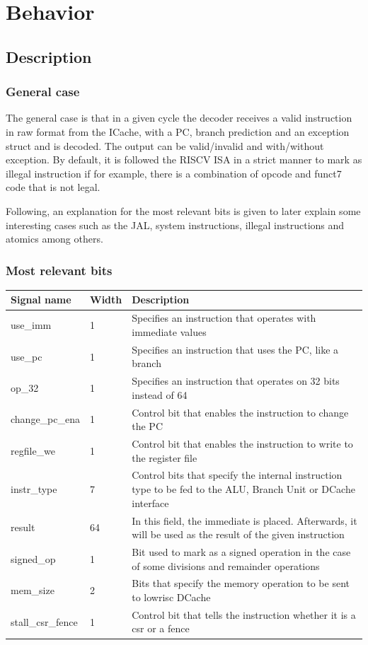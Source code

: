\section{Behavior}

\subsection{Description}

\subsubsection{General case}
The general case is that in a given cycle the decoder receives a valid instruction in raw format from the ICache, with a PC, branch prediction and an exception struct and is decoded. The output can be valid/invalid and with/without exception. By default, it is followed the RISCV ISA in a strict manner to mark as illegal instruction if for example, there is a combination of opcode and funct7 code that is not legal. 

Following, an explanation for the most relevant bits is given to later explain some interesting cases such as the JAL, system instructions, illegal instructions and atomics among others.

\subsubsection{Most relevant bits}
\begin{table}[H]
	\centering
	\begin{tabular}{l|l|p{10cm}}
		\hline \hline
		Signal name & Width & Description \\
		\hline \hline
		use\_imm & 1 & Specifies an instruction that operates with immediate values \\
		\hline
		use\_pc & 1 & Specifies an instruction that uses the PC, like a branch\\
		\hline
		op\_32 & 1 &  Specifies an instruction that operates on 32 bits instead of 64 \\
		\hline
		change\_pc\_ena & 1 & Control bit that enables the instruction to change the PC \\
		\hline
		regfile\_we & 1 & Control bit that enables the instruction to write to the register file  \\
		\hline
		instr\_type & 7  & Control bits that specify the internal instruction type to be fed to the ALU, Branch Unit or DCache interface \\
		\hline
		result & 64 & In this field, the immediate is placed. Afterwards, it will be used as the result of the given instruction  \\
		\hline
		signed\_op & 1 & Bit used to mark as a signed operation in the case of some divisions and remainder operations  \\
		\hline
		mem\_size & 2 & Bits that specify the memory operation to be sent to lowrisc DCache \\
		\hline
		stall\_csr\_fence & 1 & Control bit that tells the instruction whether it is a csr or a fence \\
		\hline
	\end{tabular}
\end{table}

